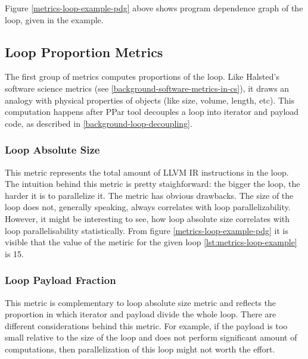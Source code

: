 \null\qquad Figure \ref{metrics-loop-example-pdg} above shows program dependence graph of the loop, given in the example. 


\subsection{Loop Proportion Metrics}
\label{metrics-loop-proportion-metrics}
\qquad The first group of metrics computes proportions of the loop. Like Halsted's software science metrics (see \ref{background-software-metrics-in-cs}), it draws an analogy with physical properties of objects (like size, volume, length, etc). This computation happens after PPar tool decouples a loop into iterator and payload code, as described in \ref{background-loop-decoupling}.  
\subsubsection{Loop Absolute Size}
\label{metrics-loop-absolute-size}
\qquad This metric represents the total amount of LLVM IR instructions in the loop. The intuition behind this metric is pretty staighforward: the bigger the loop, the harder it is to parallelize it. The metric has obvious drawbacks. The size of the loop does not, generally speaking, always correlates with loop parallelizability. However, it might be interesting to see, how loop absolute size correlates with loop parallelisability statistically. From figure \ref{metrics-loop-example-pdg} it is visible that the value of the metiric for the given loop \ref{lst:metrics-loop-example} is 15.
\subsubsection{Loop Payload Fraction}
\label{metrics-loop-payload-fraction}
\qquad This metric is complementary to loop absolute size metric and reflects the proportion in which iterator and payload divide the whole loop. There are different considerations behind this metric. For example, if the payload is too small relative to the size of the loop and does not perform significant amount of computations, then parallelization of this loop might not worth the effort.   

